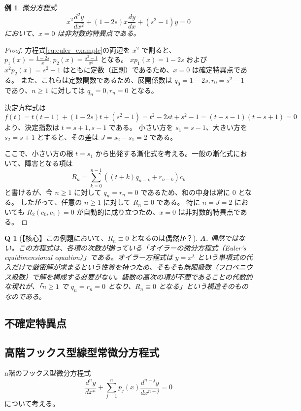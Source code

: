 \documentclass[paper=a4, fontsize=11pt]{jlreq} %
\theoremstyle{break}
\newtheorem{example}[theorem]{例}
\theoremstyle{qa}
\newtheorem*{Q}{Q}
\theoremstyle{remark} %
\begin{document}
\begin{example}
微分方程式
\begin{equation}\label{eq:euler_example}
x^{2}\frac{d^{2}y}{dx^{2}} + (1-2s)x\frac{dy}{dx} + (s^{2}-1)y = 0
\end{equation}
において、$x=0$ は非対数的特異点である。
\end{example}

\begin{proof}
方程式\eqref{eq:euler_example}の両辺を $x^2$ で割ると、$p_{1}(x) = \frac{1-2s}{x}, p_{2}(x) = \frac{s^{2}-1}{x^{2}}$ となる。
$x p_{1}(x) = 1-2s$ および $x^{2} p_{2}(x) = s^{2}-1$ はともに定数（正則）であるため、$x=0$ は確定特異点である。
また、これらは定数関数であるため、展開係数は $q_{0} = 1-2s, r_{0} = s^{2}-1$ であり、$n \ge 1$ に対しては $q_{n} = 0, r_{n} = 0$ となる。

決定方程式は
\[
f(t) = t(t-1) + (1-2s)t + (s^{2}-1) = t^{2} - 2st + s^{2} - 1 = (t-s-1)(t-s+1) = 0
\]
より、決定指数は $t = s+1, s-1$ である。
小さい方を $s_{1} = s-1$、大きい方を $s_{2} = s+1$ とすると、その差は $J = s_{2} - s_{1} = 2$ である。

ここで、小さい方の根 $t=s_{1}$ から出発する漸化式を考える。一般の漸化式において、障害となる項は
\[
R_{n} = \sum_{k=0}^{n-1} \left( (t+k)q_{n-k} + r_{n-k} \right) c_{k}
\]
と書けるが、今 $n \ge 1$ に対して $q_{n} = r_{n} = 0$ であるため、和の中身は常に $0$ となる。
したがって、任意の $n \ge 1$ に対して $R_{n} \equiv 0$ である。
特に $n = J = 2$ においても $R_{2}(c_{0}, c_{1}) = 0$ が自動的に成り立つため、$x=0$ は非対数的特異点である。
\end{proof}

\begin{Q}[【核心】この例題において、$R_n \equiv 0$ となるのは偶然か？]
\textbf{A.} 偶然ではない。この方程式は、各項の次数が揃っている「オイラーの微分方程式（Euler's equidimensional equation）」である。オイラー方程式は $y = x^{\lambda}$ という単項式の代入だけで厳密解が求まるという性質を持つため、そもそも無限級数（フロベニウス級数）で解を構成する必要がない。級数の高次の項が不要であることの代数的な現れが、「$n \ge 1$ で $q_n=r_n=0$ となり、$R_n \equiv 0$ となる」という構造そのものなのである。
\end{Q}

\subsection{不確定特異点}

\subsection{高階フックス型線型常微分方程式}
n階のフックス型微分方程式
\begin{equation}\label{eq:linear-ode-n}
    \frac{d^{n}y}{dx^{n}}+\sum_{j=1}^{n} p_{j}(x)\frac{d^{n-j}y}{dx^{n-j}} = 0   
\end{equation}
について考える。
\end{document}
